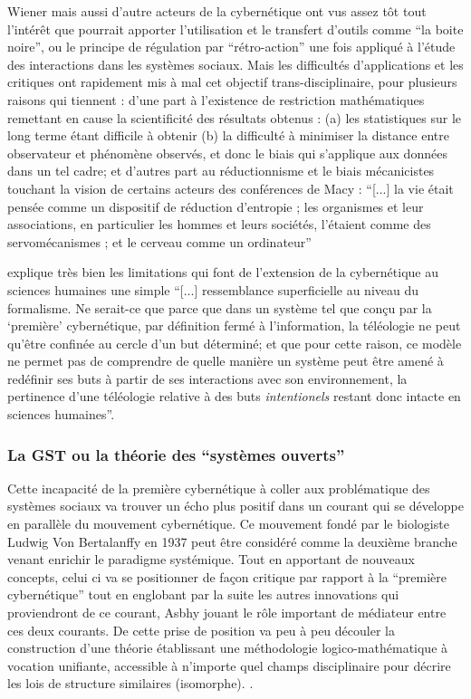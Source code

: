 Wiener mais aussi d'autre acteurs de la cybernétique ont vus assez tôt tout l'intérêt que pourrait apporter l'utilisation et le transfert d'outils comme \enquote{la boite noire}, ou le principe de régulation par \enquote{rétro-action} une fois appliqué à l'étude des interactions dans les systèmes sociaux. Mais les difficultés d'applications et les critiques ont rapidement mis à mal cet objectif trans-disciplinaire, pour plusieurs raisons qui tiennent : d'une part à l'existence de restriction mathématiques remettant en cause la scientificité des résultats obtenus : (a) les statistiques sur le long terme étant difficile à obtenir (b) la difficulté à minimiser la distance entre observateur et phénomène observés, et donc le biais qui s'applique aux données dans un tel cadre; et d'autres part au réductionnisme et le biais mécanicistes touchant la vision de certains acteurs des conférences de Macy  : \enquote{[...] la vie était pensée comme un dispositif de réduction d'entropie ; les organismes et leur associations, en particulier les hommes et leurs sociétés, l'étaient comme des servomécanismes ; et le cerveau comme un ordinateur} \autocite[784]{Pouvreau2013}

\autocite[782]{Pouvreau2013} explique très bien les limitations qui font  de l'extension de la cybernétique au sciences humaines une simple \enquote{[...] ressemblance superficielle au niveau du formalisme. Ne serait-ce que parce que dans un système tel que conçu par la \enquote{première} cybernétique, par définition fermé à l'information, la téléologie ne peut qu'être confinée au cercle d'un but déterminé; et que pour cette raison, ce modèle ne permet pas de comprendre de quelle manière un système peut être amené à redéfinir ses buts à partir de ses interactions avec son environnement, la pertinence d'une téléologie relative à des buts \textit{intentionels} restant donc intacte en sciences humaines}.

\subsubsection{La GST ou la théorie des \enquote{systèmes ouverts}}
\label{ssubsec:gst}

Cette incapacité de la première cybernétique à coller aux problématique des systèmes sociaux va trouver un écho plus positif dans un courant qui se développe en parallèle du mouvement cybernétique. Ce mouvement fondé par le biologiste Ludwig Von Bertalanffy en 1937 peut être considéré comme la deuxième branche venant enrichir le paradigme systémique. Tout en apportant de nouveaux concepts, celui ci va se positionner de façon critique par rapport à la \enquote{première cybernétique} tout en englobant par la suite les autres innovations qui proviendront de ce courant, Asbhy jouant le rôle important de médiateur entre ces deux courants.\autocite[]{Pouvreau2013} De cette prise de position va peu à peu découler la construction d'une théorie établissant une méthodologie logico-mathématique à vocation unifiante, accessible à n'importe quel champs disciplinaire pour décrire les lois de structure similaires (isomorphe). \autocite{LeMoigne2006a}.

